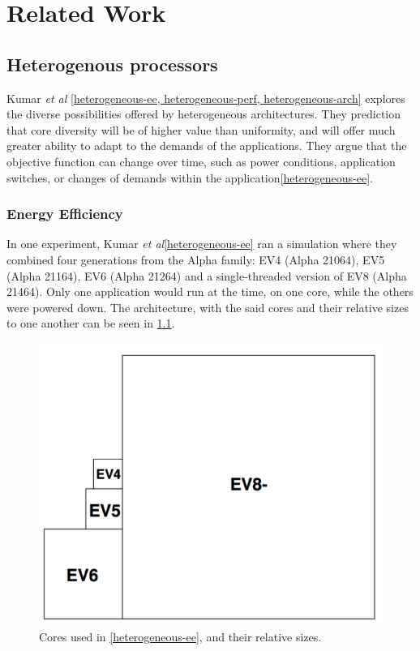 \chapter{Related Work}
\label{cha:related-work}

\section{Heterogenous processors}

Kumar \textit{et al} \ref{heterogeneous-ee, heterogeneous-perf, heterogeneous-arch} explores the diverse possibilities offered by heterogeneous architectures. 
They prediction that core diversity will be of higher value than uniformity, and will offer much greater ability to adapt to the demands of the applications.
They argue that the objective function can change over time, such as power conditions, application switches, or changes of demands within the application\ref{heterogeneous-ee}. 

\subsection{Energy Efficiency}
In one experiment, Kumar \textit{et al}\ref{heterogeneous-ee} ran a simulation where they combined four generations from the Alpha family: EV4 (Alpha 21064), EV5 (Alpha 21164), EV6 (Alpha 21264) and a single-threaded version of EV8 (Alpha 21464).
Only one application would run at the time, on one core, while the others were powered down.
The architecture, with the said cores and their relative sizes to one another can be seen in 
\ref{fig:Kumar1}.

\begin{figure}[htb]
    \centering
    \includegraphics[width=1.0\textwidth]{Figures/Heterogeneous/Kumar1}
    \caption{Cores used in \ref{heterogeneous-ee}, and their relative sizes.}
    \label{fig:Kumar1}
\end{figure}


